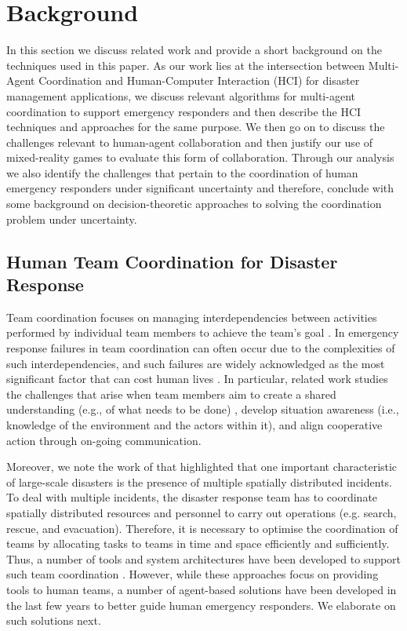 \section{Background}
In this section we discuss related work and provide a short background on the techniques used in this paper.  As our work lies at the intersection between Multi-Agent Coordination and Human-Computer Interaction (HCI) for disaster management applications, we discuss relevant algorithms for multi-agent coordination to support emergency responders and then describe the HCI techniques and approaches for the same purpose. We then go on to discuss the challenges relevant to human-agent collaboration and then justify our use of mixed-reality games to evaluate this form of collaboration.  Through our analysis we also identify the challenges that pertain to the coordination of human emergency responders under significant uncertainty and therefore, conclude with some background on decision-theoretic approaches to solving the coordination problem under uncertainty.



\subsection{Human Team Coordination for Disaster Response}
Team coordination focuses on managing interdependencies between activities performed  by individual team members to achieve the team's goal \cite{Malone1990}. In emergency response failures in team coordination can often occur due to the complexities of such interdependencies, and such failures are widely acknowledged as the most significant factor that can cost human lives \cite[p. 2]{Toups2011}. In particular, related work studies the challenges that arise when team members aim to create a shared understanding (e.g., of what needs to be done) \cite{Convertino2011}, develop situation awareness (i.e., knowledge of the environment and the actors within it), and align cooperative action through on-going communication.  

Moreover, we note the work of \cite{chen2005} that highlighted that one important characteristic of large-scale disasters is the presence of multiple spatially distributed incidents. To deal with multiple incidents, the disaster response team has to coordinate spatially distributed resources and personnel to carry out operations (e.g. search, rescue, and evacuation). Therefore, it is necessary to optimise the coordination of teams by allocating tasks to teams in time and space efficiently and sufficiently. Thus, a number of tools and system architectures have been developed to support such team coordination \cite{Monares2011} \cite{Padilha2010} \cite{Convertino2011}. However, while these approaches focus on providing tools to human teams, a number of agent-based solutions have been developed in the last few years to better guide human emergency responders. We elaborate on such solutions next.
\

